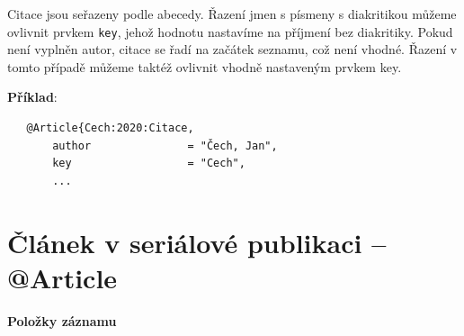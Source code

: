 Citace jsou seřazeny podle abecedy. Řazení jmen s písmeny s diakritikou můžeme ovlivnit prvkem \texttt{key}, jehož  hodnotu nastavíme na příjmení bez diakritiky. Pokud není vyplněn autor, citace se řadí na začátek seznamu, což není vhodné. Řazení v tomto případě můžeme taktéž ovlivnit vhodně nastaveným prvkem key.

\medskip
\medskip
\noindent \textbf{Příklad}:
\begin{verbatim}
   @Article{Cech:2020:Citace,
	   author               = "Čech, Jan",
	   key                  = "Cech",
	   ... 
\end{verbatim}


\newpage
\section*{Článek v seriálové publikaci -- @Article}
\label{pr-casopis-clanek}
\noindent \textbf{Položky záznamu}

\medskip

